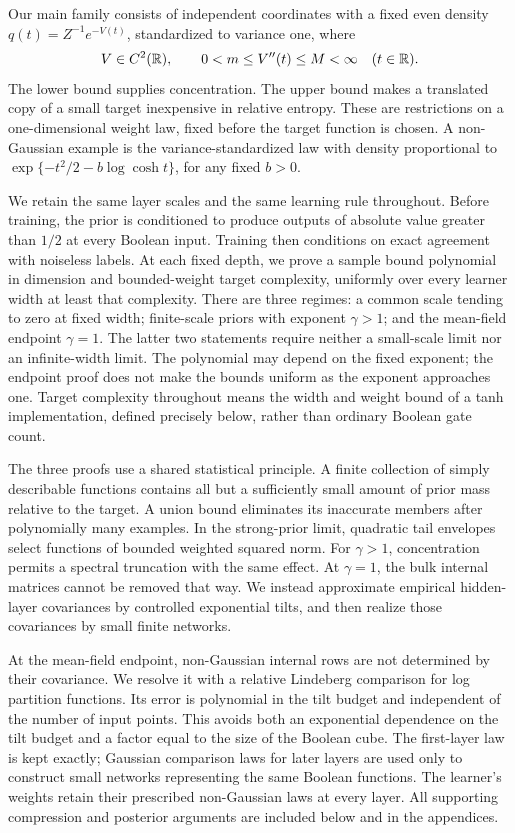 \documentclass[11pt]{article}
\theoremstyle{remark}\newtheorem{remark}[theorem]{Remark}
\begin{document}
Our main family consists of independent coordinates with a fixed even
density $q(t)=Z^{-1}e^{-V(t)}$, standardized to variance one, where
\begin{equation}\label{eq:curvature}
 V\in C^2(\mathbb R),\qquad 0<m\leq V''(t)\leq M<\infty
 \quad(t\in\mathbb R).
\end{equation}
The lower bound supplies concentration. The upper bound makes a translated
copy of a small target inexpensive in relative entropy. These are
restrictions on a one-dimensional weight law, fixed before the target
function is chosen. A non-Gaussian
example is the variance-standardized law with density proportional to
$\exp\{-t^2/2-b\log\cosh t\}$, for any fixed $b>0$.

We retain the same layer scales and the same learning rule throughout.
Before training, the prior is conditioned to produce outputs of absolute
value greater than $1/2$ at every Boolean input. Training then conditions
on exact agreement with noiseless labels. At each fixed depth, we prove a
sample bound polynomial in dimension and bounded-weight target complexity,
uniformly over every learner width at least that complexity. There are
three regimes: a common scale tending to zero at fixed width; finite-scale
priors with exponent $\gamma>1$; and the mean-field endpoint $\gamma=1$.
The latter two statements require neither a small-scale limit nor an
infinite-width limit. The polynomial may depend on the fixed exponent;
the endpoint proof does not make the bounds uniform as the exponent
approaches one. Target complexity throughout means the width and weight
bound of a tanh implementation, defined precisely below, rather than
ordinary Boolean gate count.

The three proofs use a shared statistical principle. A finite collection
of simply describable functions contains all but a sufficiently small
amount of prior mass relative to the target. A union bound eliminates its
inaccurate members after polynomially many examples. In the strong-prior
limit, quadratic tail envelopes select functions of bounded weighted
squared norm. For $\gamma>1$, concentration permits a spectral truncation
with the same effect. At $\gamma=1$, the bulk internal matrices cannot be
removed that way. We instead approximate empirical hidden-layer covariances
by controlled exponential tilts, and then realize those covariances by
small finite networks.

At the mean-field endpoint, non-Gaussian internal
rows are not determined by their covariance. We resolve it with a relative
Lindeberg comparison for log partition functions. Its error is polynomial
in the tilt budget and independent of the number of input points. This
avoids both an exponential dependence on the tilt budget and a factor equal
to the size of the Boolean cube. The first-layer law is kept exactly;
Gaussian comparison laws for later layers are used only to construct
small networks representing the same Boolean functions. The learner's
weights retain their prescribed non-Gaussian laws at every layer. All
supporting compression and posterior arguments are included below and in
the appendices.
\end{document}
